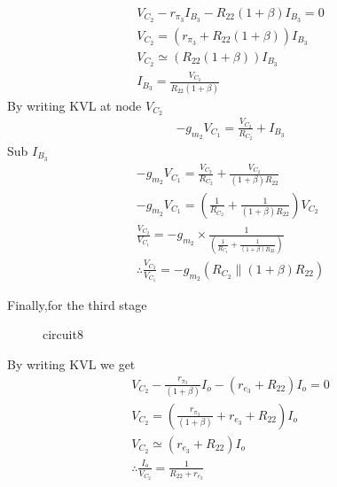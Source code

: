 \begin{enumerate}[label=\thesection.\arabic*.,ref=\thesection.\theenumi]
\begin{align}
    V_{C_{2}}-r_{\pi_{3}}I_{B_{3}} -R_{22}(1+\beta)I_{B_{3}}=0 \\
    V_{C_{2}} = (r_{\pi_{3}} + R_{22}(1+\beta))I_{B_{3}} \\
    V_{C_{2}} \simeq ( R_{22}(1+\beta))I_{B_{3}} \\
    I_{B_{3}} = \frac{V_{C_{2}}}{R_{22}(1+\beta)}
\end{align}
By writing KVL at node $V_{C_{2}} $
\begin{align}
    -g_{m_{2}}V_{C_{1}} = \frac{V_{C_{2}}}{R_{C_{2}}} + I_{B_{3}}
\end{align}
Sub $I_{B_{3}}$
\begin{align}
    -g_{m_{2}}V_{C_{1}} = \frac{V_{C_{2}}}{R_{C_{2}}} + \frac{V_{C_{2}}}{(1+\beta)R_{22}} \\
    -g_{m_{2}}V_{C_{1}} = (\frac{1}{R_{C_{2}}} + \frac{1}{(1+\beta)R_{22}})V_{C_{2}} \\
    \frac{V_{C_{2}}}{V_{C_{1}}} = -g_{m_{2}} \times \frac{1}{(\frac{1}{R_{C_{2}}} + \frac{1}{(1+\beta)R_{22}})} \\
    \therefore \frac{V_{C_{2}}}{V_{C_{1}}} = -g_{m_{2}}(R_{C_{2}} \parallel (1+\beta)R_{22})
\end{align}

Finally,for the third stage 
\begin{figure}[!ht]
	\begin{center}
		
		\resizebox{\columnwidth}{!}{}
	\end{center}
\caption{circuit8}
\label{fig:ee18btech11007_circuit8}
\end{figure}

By writing KVL we get
\begin{align}
    V_{C_{2}}-\frac{r_{\pi_{3}}}{(1+\beta)}I_{o}-(r_{e_{3}}+R_{22})I_{o}=0 \\
    V_{C_{2}} = (\frac{r_{\pi_{3}}}{(1+\beta)}+ r_{e_{3}}+R_{22})I_{o} \\
    V_{C_{2}} \simeq (r_{e_{3}}+R_{22})I_{o}\\
    \therefore \frac{I_{o}}{V_{C_{2}}} = \frac{1}{R_{22}+r_{e_{3}}} 
\end{align}


\end{enumerate}
